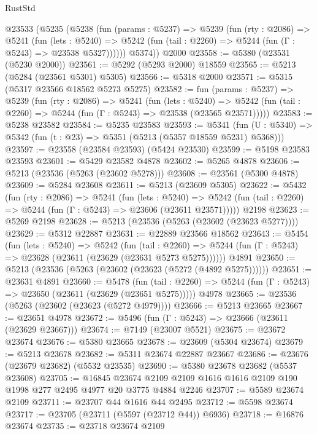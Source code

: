 \begin{lexlean}{RustStd}
\begin{coremodule}
    @23533
      (@5235
        (@5238
          (fun (params : @5237) =>
          @5239
            (fun (rty : @2086) =>
            @5241
              (fun (lets : @5240) =>
              @5242 (fun (tail : @2260) => @5244 (fun (Γ : @5243) => @23538 @5327))))))
        @5374))
    @2000
@23558 := @5380 (@23531 (@5230 @2000))
@23561 := @5292 (@5293 @2000) @18559
@23565 := @5213 (@5284 (@23561 @5301) @5305)
@23566 := @5318 @2000
@23571 := @5315 (@5317 @23566 @18562 @5273 @5275)
@23582 := fun (params : @5237) =>
  @5239
    (fun (rty : @2086) =>
    @5241
      (fun (lets : @5240) =>
      @5242 (fun (tail : @2260) => @5244 (fun (Γ : @5243) => @23538 (@23565 @23571)))))
@23583 := @5238 @23582
@23584 := @5235 @23583
@23593 := @5341
    (fun (U : @5340) => @5342 (fun (t : @23) => @5351 (@5213 (@5357 @18559 @5231) @5368)))
@23597 := @23558 (@23584 @23593) (@5424 @23530)
@23599 := @5198 @23583 @23593
@23601 := @5429 @23582 @4878
@23602 := @5265 @4878
@23606 := @5213 (@23536 (@5263 (@23602 @5278)))
@23608 := @23561 (@5300 @4878)
@23609 := @5284 @23608
@23611 := @5213 (@23609 @5305)
@23622 := @5432
    (fun (rty : @2086) =>
    @5241
      (fun (lets : @5240) =>
      @5242 (fun (tail : @2260) => @5244 (fun (Γ : @5243) => @23606 (@23611 @23571)))))
    @2198
@23623 := @5269 @2198
@23628 := @5213 (@23536 (@5263 (@23602 (@23623 @5277))))
@23629 := @5312 @22887
@23631 := @22889 @23566 @18562
@23643 := @5454
    (fun (lets : @5240) =>
    @5242
      (fun (tail : @2260) =>
      @5244 (fun (Γ : @5243) => @23628 (@23611 (@23629 (@23631 @5273 @5275))))))
    @4891
@23650 := @5213 (@23536 (@5263 (@23602 (@23623 (@5272 (@4892 @5275))))))
@23651 := @23631 @4891
@23660 := @5478
    (fun (tail : @2260) => @5244 (fun (Γ : @5243) => @23650 (@23611 (@23629 (@23651 @5275)))))
    @4978
@23665 := @23536 (@5263 (@23602 (@23623 (@5272 @4979))))
@23666 := @5213 @23665
@23667 := @23651 @4978
@23672 := @5496 (fun (Γ : @5243) => @23666 (@23611 (@23629 @23667)))
@23674 := @7149 (@23007 @5521)
@23675 := @23672 @23674
@23676 := @5380 @23665
@23678 := @23609 (@5304 @23674)
@23679 := @5213 @23678
@23682 := @5311 @23674 @22887 @23667
@23686 := @23676 (@23679 @23682) (@5532 @23535)
@23690 := @5380 @23678 @23682 (@5537 @23608)
@23705 := @16845
    @23674
    @2109
    @2109
    @1616
    @1616
    @2109
    @190
    @1998
    @277
    @2495
    @4977
    @20
    @3775
    @4884
    @2246
@23707 := @5589 @23674 @2109
@23711 := @23707 @44 @1616 @44 @2495
@23712 := @5598 @23674
@23717 := @23705 (@23711 (@5597 (@23712 @44)) @6936)
@23718 := @16876 @23674
@23735 := @23718
    @23674
    @2109

\end{coremodule}
\end{lexlean}

